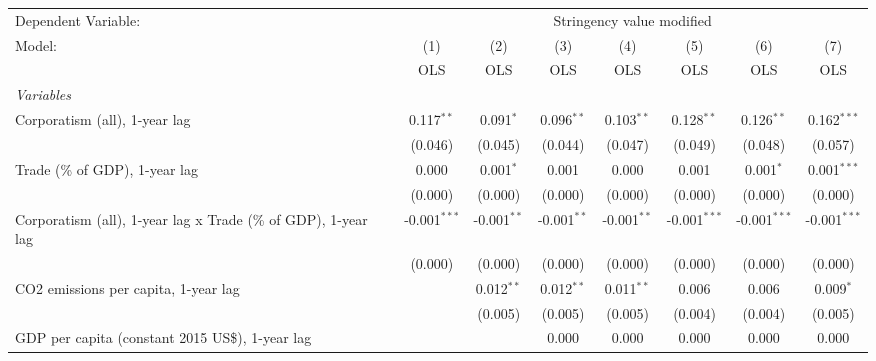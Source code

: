 
\begingroup
\centering
\begin{tabular}{lccccccc}
   \toprule
   Dependent Variable: & \multicolumn{7}{c}{Stringency value modified}\\
   Model:                                                         & (1)            & (2)           & (3)           & (4)           & (5)            & (6)            & (7)\\  
                                                                  &  OLS           & OLS           & OLS           & OLS           & OLS            & OLS            & OLS\\  
   \midrule
   \emph{Variables}\\
   Corporatism (all), 1-year lag                                  & 0.117$^{**}$   & 0.091$^{*}$   & 0.096$^{**}$  & 0.103$^{**}$  & 0.128$^{**}$   & 0.126$^{**}$   & 0.162$^{***}$\\   
                                                                  & (0.046)        & (0.045)       & (0.044)       & (0.047)       & (0.049)        & (0.048)        & (0.057)\\   
   Trade (\% of GDP), 1-year lag                                  & 0.000          & 0.001$^{*}$   & 0.001         & 0.000         & 0.001          & 0.001$^{*}$    & 0.001$^{***}$\\   
                                                                  & (0.000)        & (0.000)       & (0.000)       & (0.000)       & (0.000)        & (0.000)        & (0.000)\\   
   Corporatism (all), 1-year lag x Trade (\% of GDP), 1-year lag  & -0.001$^{***}$ & -0.001$^{**}$ & -0.001$^{**}$ & -0.001$^{**}$ & -0.001$^{***}$ & -0.001$^{***}$ & -0.001$^{***}$\\   
                                                                  & (0.000)        & (0.000)       & (0.000)       & (0.000)       & (0.000)        & (0.000)        & (0.000)\\   
   CO2 emissions per capita, 1-year lag                           &                & 0.012$^{**}$  & 0.012$^{**}$  & 0.011$^{**}$  & 0.006          & 0.006          & 0.009$^{*}$\\   
                                                                  &                & (0.005)       & (0.005)       & (0.005)       & (0.004)        & (0.004)        & (0.005)\\   
   GDP per capita (constant 2015 US\$), 1-year lag                &                &               & 0.000         & 0.000         & 0.000          & 0.000          & 0.000\\   

\end{tabular}
